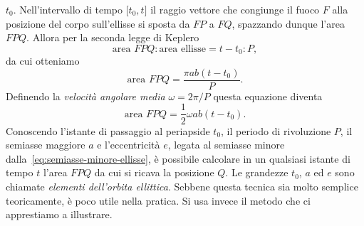 $t_0$. Nell'intervallo di tempo $\mathopen{[}t_0, t\mathclose{]}$ il raggio
vettore che congiunge il fuoco $F$ alla posizione del corpo sull'ellisse si
sposta da $FP$ a $FQ$, spazzando dunque l'area $FPQ$. Allora per la seconda
legge di Keplero
\begin{equation}
  \text{area } FPQ : \text{area ellisse} = t-t_0 : P,
\end{equation}
da cui otteniamo
\begin{equation}
  \text{area } FPQ = \frac{\pi ab(t-t_0)}{P}.
\end{equation}
Definendo la \emph{velocità angolare media} $\omega = 2\pi/P$ questa equazione
diventa
\begin{equation}
  \text{area } FPQ = \frac{1}{2}\omega ab(t-t_0).
\end{equation}
Conoscendo l'istante di passaggio al periapside $t_0$, il periodo di rivoluzione
$P$, il semiasse maggiore $a$ e l'eccentricità $e$, legata al semiasse minore
dalla~\eqref{eq:semiasse-minore-ellisse}, è possibile calcolare in un qualsiasi
istante di tempo $t$ l'area $FPQ$ da cui si ricava la posizione $Q$. Le
grandezze $t_0$, $a$ ed $e$ sono chiamate \emph{elementi dell'orbita
  ellittica}. Sebbene questa tecnica sia molto semplice teoricamente, è poco
utile nella pratica. Si usa invece il metodo che ci apprestiamo a illustrare.

